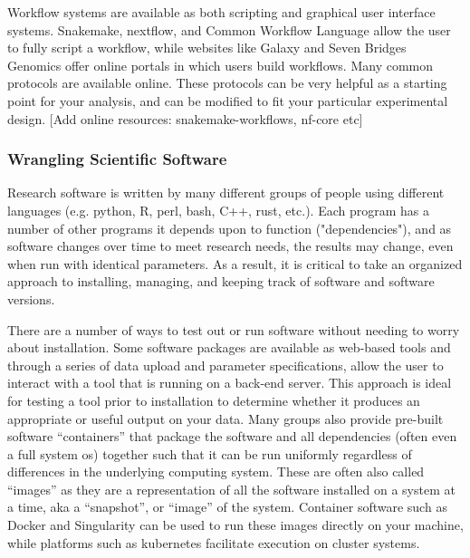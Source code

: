 \documentclass[10pt,letterpaper]{article}
\begin{document}
Workflow systems are available as both scripting and graphical user interface systems. Snakemake, nextflow, and Common Workflow Language allow the user to fully script a workflow, while websites like Galaxy and Seven Bridges Genomics offer online portals in which users build workflows. Many common protocols are available online. These protocols can be very helpful as a starting point for your analysis, and can be modified to fit your particular experimental design. [Add online resources: snakemake-workflows, nf-core etc] %


\subsubsection*{Wrangling Scientific Software} Research software is written by many different groups of people using different languages (e.g. python, R, perl, bash, C++, rust, etc.). Each program has a number of other programs it depends upon to function ("dependencies"), and as software changes over time to meet research needs, the results may change, even when run with identical parameters. As a result, it is critical to take an organized approach to installing, managing, and keeping track of software and software versions. 

There are a number of ways to test out or run software without needing to worry about installation. Some software packages are available as web-based tools and through a series of data upload and parameter specifications, allow the user to interact with a tool that is running on a back-end server. This approach is ideal for testing a tool prior to installation to determine whether it produces an appropriate or useful output on your data. Many groups also provide pre-built software “containers” that package the software and all dependencies (often even a full system os) together such that it can be run uniformly regardless of differences in the underlying computing system. These are often also called “images” as they are a representation of all the software installed on a system at a time, aka a “snapshot”, or “image” of the system. Container software such as Docker and Singularity can be used to run these images directly on your machine, while platforms such as kubernetes facilitate execution on cluster systems.
\end{document}
